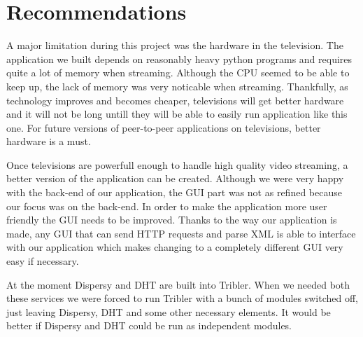 \chapter{Recommendations}
\label{sec:recommendations}

A major limitation during this project was the hardware in the television. The application we built depends on reasonably heavy python programs and requires quite a lot of memory when streaming. Although the CPU seemed to be able to keep up, the lack of memory was very noticable when streaming. Thankfully, as technology improves and becomes cheaper, televisions will get better hardware and it will not be long untill they will be able to easily run application like this one. For future versions of peer-to-peer applications on televisions, better hardware is a must.

Once televisions are powerfull enough to handle high quality video streaming, a better version of the application can be created. Although we were very happy with the back-end of our application, the GUI part was not as refined because our focus was on the back-end. In order to make the application more user friendly the GUI needs to be improved. Thanks to the way our application is made, any GUI that can send HTTP requests and parse XML is able to interface with our application which makes changing to a completely different GUI very easy if necessary.

At the moment Dispersy and DHT are built into Tribler. When we needed both these services we were forced to run Tribler with a bunch of modules switched off, just leaving Dispersy, DHT and some other necessary elements. It would be better if Dispersy and DHT could be run as independent modules.
